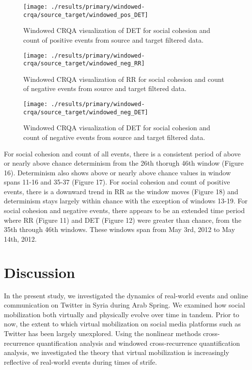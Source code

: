 \documentclass[english,man]{apa6}
\begin{document}
\begin{figure}
\texttt{[image: ./results/primary/windowed-crqa/source\_target/windowed\_pos\_DET]} \caption{Windowed CRQA visualization of DET for social cohesion and count of positive events from source and target filtered data.}\label{fig:plot-DET-source-targ-pos}
\end{figure}

\begin{figure}
\texttt{[image: ./results/primary/windowed-crqa/source\_target/windowed\_neg\_RR]} \caption{Windowed CRQA visualization of RR for social cohesion and count of negative events from source and target filtered data.}\label{fig:plot-RR-source-targ-neg}
\end{figure}

\begin{figure}
\texttt{[image: ./results/primary/windowed-crqa/source\_target/windowed\_neg\_DET]} \caption{Windowed CRQA visualization of DET for social cohesion and count of negative events from source and target filtered data.}\label{fig:plot-DET-source-targ-neg}
\end{figure}

For social cohesion and count of all events, there is a consistent period of above or nearly above chance determinism from the 26th thorugh 46th window (Figure 16). Determinism also shows above or nearly above chance values in window spans 11-16 and 35-37 (Figure 17). For social cohesion and count of positive events, there is a downward trend in RR as the window moves (Figure 18) and determinism stays largely within chance with the exception of windows 13-19. For social cohesion and negative events, there appears to be an extended time period where RR (Figure 11) and DET (Figure 12) were greater than chance, from the 35th through 46th windows. These windows span from May 3rd, 2012 to May 14th, 2012.

\hypertarget{discussion}{%
\section{Discussion}\label{discussion}}

In the present study, we investigated the dynamics of real-world events and online communication on Twitter in Syria during Arab Spring. We examined how social mobilization both virtually and physically evolve over time in tandem. Prior to now, the extent to which virtual mobilization on social media platforms such as Twitter has been largely unexplored. Using the nonlinear methods cross-recurrence quantification analysis and windowed cross-recurrence quantification analysis, we investigated the theory that virtual mobilization is increasingly reflective of real-world events during times of strife.
\end{document}
